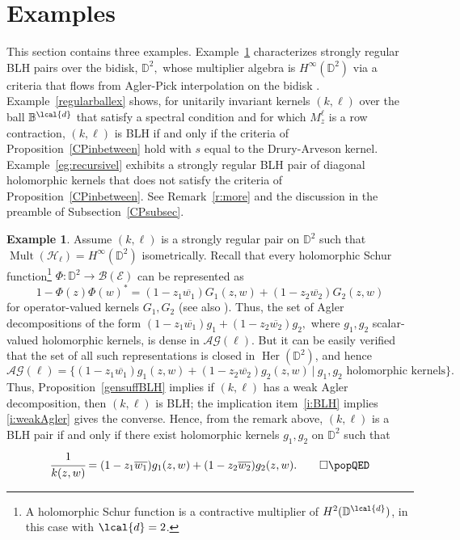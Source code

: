 \documentclass[a4paper,reqno,index]{amsart}
\numberwithin{equation}{section}
\newcommand{\DD}{\mathbb{D}}
\newcommand{\Mult}{\operatorname{Mult}}
\newcommand{\Her}{\operatorname{Her}}
\theoremstyle{definition}
\newtheorem{example}[theorem]{Example}
\begin{document}
\section{Examples}\label{Exampsec}
  This section contains three examples.  Example~\ref{bidiskex}
  characterizes strongly regular BLH pairs over the bidisk,
  $\mathbb{D}^2,$ whose multiplier algebra is $H^\infty(\mathbb{D}^2)$ via a criteria that flows from  Agler-Pick interpolation  on the bidisk \cite{Hellinger}.
  Example~\ref{regularballex} shows, for unitarily invariant kernels 
  $(k,\ell)$ over the ball $\mathbb{B}^\lcal{d}$ that satisfy a spectral condition and for which $M_z^\ell$ is a row contraction,  $(k,\ell)$
  is BLH if and only if the criteria of Proposition~\ref{CPinbetween} hold with $s$ equal to the
  Drury-Arveson kernel.   Example~\ref{eg:recursivel} exhibits
  a strongly regular BLH pair of diagonal holomorphic kernels that does not satisfy the 
  criteria of Proposition~\ref{CPinbetween}. See Remark~\ref{r:more} and the discussion in the preamble
  of Subsection~\ref{CPsubsec}.
  

 \begin{example} \label{bidiskex}
\pushQED{\qed}
Assume $(k, \ell)$ is a strongly regular pair on $\DD^2$ such that $\Mult(\mathcal{H}_{\ell})=H^{\infty}(\DD^2)$ isometrically. 
Recall that every holomorphic Schur function\footnote{A holomorphic Schur function is a contractive multiplier of $H^2(\DD^\lcal{d})$,
in this case with $\lcal{d}=2$.} $\Phi:\DD^2\to\mathcal{B}(\mathcal{E})$ can be represented as 
\[1-\Phi(z)\Phi(w)^*= (1-z_1\overline{w_1})G_1(z,w)+(1-z_2\overline{w_2})G_2(z,w)\]
for operator-valued kernels $G_1, G_2$ \cite{Hellinger} (see also \cite{BickelKnese}). Thus, the set of Agler decompositions of the form $(1-z_1\overline{w_1})g_1+(1-z_2\overline{w_2})g_2,$ where $g_1, g_2$ scalar-valued holomorphic kernels, is dense in 
$\mathcal{AG}(\ell)$. But it can be easily verified that the set of all such representations is closed in $\Her(\DD^2)$, and hence
\[
\mathcal{AG}(\ell)=\big\{ (1-z_1\overline{w_1})g_1(z,w)+(1-z_2\overline{w_2})g_2(z,w) \ |\  g_1, g_2\text{ holomorphic kernels}\big\}.
\]
Thus, Proposition~\ref{gensuffBLH} implies  if $(k,\ell)$ has
a weak Agler decomposition, then $(k,\ell)$ is BLH;  the implication item~\ref{i:BLH} implies \ref{i:weakAgler} gives the converse.
Hence, from the remark above, 
   $(k, \ell)$ is a BLH pair if and only if there exist holomorphic kernels $g_1, g_2$ on $\DD^2$ such that 
\[\cfrac{1}{k(z,w)}= (1-z_1\overline{w_1})g_1(z,w)+(1-z_2\overline{w_2})g_2(z,w).  \qedhere \popQED 
\]
 \end{example}
\end{document}
